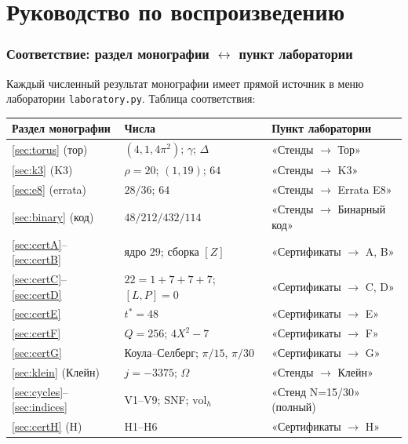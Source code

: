 \part{Руководство по воспроизведению}

\section{Соответствие: раздел монографии $\leftrightarrow$ пункт
лаборатории}\label{sec:labmap}

Каждый численный результат монографии имеет прямой источник в меню
лаборатории \texttt{laboratory.py}. Таблица соответствия:

\begin{center}
\small
\begin{tabularx}{\textwidth}{@{}l l >{\raggedright\arraybackslash}X@{}}
\toprule
Раздел монографии & Числа & Пункт лаборатории \\
\midrule
\ref{sec:torus} (тор) & $(4,1,4\pi^2)$; $\gamma$; $\Delta$ &
«Стенды $\to$ Тор» \\
\ref{sec:k3} (K3) & $\rho=20$; $(1,19)$; $64$ & «Стенды $\to$ K3» \\
\ref{sec:e8} (errata) & $28/36$; $64$ & «Стенды $\to$ Errata E8» \\
\ref{sec:binary} (код) & $48/212/432/114$ & «Стенды $\to$ Бинарный
код» \\
\ref{sec:certA}--\ref{sec:certB} & ядро $29$; сборка $[Z]$ &
«Сертификаты $\to$ A, B» \\
\ref{sec:certC}--\ref{sec:certD} & $22=1+7+7+7$; $[L,P]=0$ &
«Сертификаты $\to$ C, D» \\
\ref{sec:certE} & $t^*=48$ & «Сертификаты $\to$ E» \\
\ref{sec:certF} & $Q=256$; $4X^2-7$ & «Сертификаты $\to$ F» \\
\ref{sec:certG} & Коула--Селберг; $\pi/15$, $\pi/30$ & «Сертификаты
$\to$ G» \\
\ref{sec:klein} (Клейн) & $j=-3375$; $\Omega$ & «Стенды $\to$
Клейн» \\
\ref{sec:cycles}--\ref{sec:indices} & V1--V9; SNF; $\mathrm{vol}_h$
& «Стенд N=15/30» (полный) \\
\ref{sec:certH} (H) & H1--H6 & «Сертификаты $\to$ H» \\
\bottomrule
\end{tabularx}
\end{center}

